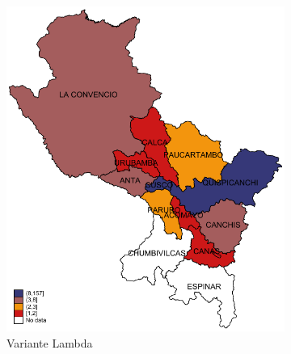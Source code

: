\documentclass[12pt,a4paper,openany]{book}
\begin{document}
			\begin{figure}[h]
				\caption{Distribución provincial de las variantes de SARS-CoV-2 aisladas en la Región Cusco hasta la SE 12-2022.}
				\label{fig:mapa_variantes}
				\centering
				\begin{subfigure}[b]{0.40\textwidth}
					\centering
					\includegraphics[width=\textwidth]{../figuras/variantes_provincial_lambda.pdf}
					\caption{Variante Lambda}
				\end{subfigure}
				\hfill
				\begin{subfigure}[b]{0.40\textwidth}
					\centering

\end{subfigure}
\end{figure}
\end{document}
